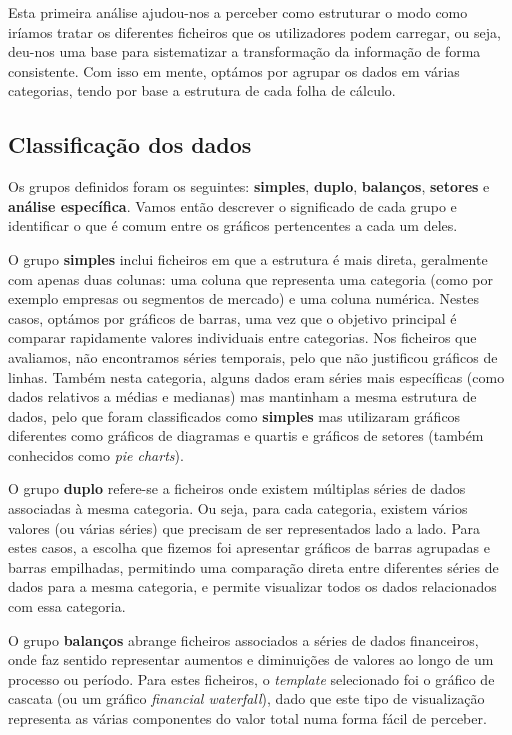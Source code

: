 Esta primeira análise ajudou-nos a perceber como estruturar o modo como iríamos tratar os diferentes ficheiros que os utilizadores podem carregar, ou seja, deu-nos uma base para sistematizar a transformação da informação de forma consistente. Com isso em mente, optámos por agrupar os dados em várias categorias, tendo por base a estrutura de cada folha de cálculo.

\subsection{Classificação dos dados}

Os grupos definidos foram os seguintes: \textbf{simples}, \textbf{duplo}, \textbf{balanços}, \textbf{setores} e \textbf{análise específica}. Vamos então descrever o significado de cada grupo e identificar o que é comum entre os gráficos pertencentes a cada um deles.

O grupo \textbf{simples} inclui ficheiros em que a estrutura é mais direta, geralmente com apenas duas colunas: uma coluna que representa uma categoria (como por exemplo empresas ou segmentos de mercado) e uma coluna numérica. Nestes casos, optámos por gráficos de barras, uma vez que o objetivo principal é comparar rapidamente valores individuais entre categorias. Nos ficheiros que avaliamos, não encontramos séries temporais, pelo que não justificou gráficos de linhas. Também nesta categoria, alguns dados eram séries mais específicas (como dados relativos a médias e medianas) mas mantinham a mesma estrutura de dados, pelo que foram classificados como \textbf{simples} mas utilizaram gráficos diferentes como gráficos de diagramas e quartis e gráficos de setores (também conhecidos como \textit{pie charts}).

O grupo \textbf{duplo} refere-se a ficheiros onde existem múltiplas séries de dados associadas à mesma categoria. Ou seja, para cada categoria, existem vários valores (ou várias séries) que precisam de ser representados lado a lado. Para estes casos, a escolha que fizemos foi apresentar gráficos de barras agrupadas e barras empilhadas, permitindo uma comparação direta entre diferentes séries de dados para a mesma categoria, e permite visualizar todos os dados relacionados com essa categoria.

O grupo \textbf{balanços} abrange ficheiros associados a séries de dados financeiros, onde faz sentido representar aumentos e diminuições de valores ao longo de um processo ou período. Para estes ficheiros, o \textit{template} selecionado foi o gráfico de cascata (ou um gráfico \textit{financial waterfall}), dado que este tipo de visualização representa as várias componentes do valor total numa forma fácil de perceber.


